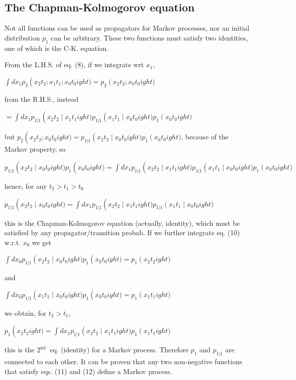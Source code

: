 \subsection*{The Chapman-Kolmogorov equation}
Not all functions can be used as propagators for Markov processes, nor an
initial distribution $p_{1}$ can be arbitrary. These two functions must satisfy
two identities, one of which is the C-K. equation.

From the L.H.S. of eq. (8), if we integrate wrt $x_1$,
\begin{DispWithArrows}[displaystyle, format=c]
  $\int d x_{1} p_{3}
  \left(x_{2} t_{2} ; x_{1} t_{1} ; x_{0} t_{0}ight)=p_{2}
  \left(x_{2} t_{2} ; x_{0} t_{0}ight)$
\end{DispWithArrows}
from the R.H.S., instead
\begin{DispWithArrows}[displaystyle, format=c]
  $=\int d x_{1} p_{1|1}
  \left(x_{2} t_{2}
  \mid x_{1} t_{1}ight) p_{1|1}
  \left(x_{1} t_{1}
  \mid x_{0} t_{0}ight) p_{1}
  \left(x_{0} t_{0}ight)$
\end{DispWithArrows}
but $p_{2}
\left(x_{2} t_{2} ; x_{0} t_{0}ight)=p_{1|1}
\left(x_{2} t_{2}
  \mid x_{0} t_{0}ight) p_{1}
  \left(x_{0} t_{0}ight)$, because of the Markov property, so
\begin{DispWithArrows}[displaystyle, format=c]
  $p_{1|1}
  \left(x_{2} t_{2}
  \mid x_{0} t_{0}ight) p_{1}
  \left(x_{0} t_{0}ight)=\int d x_{1} p_{1|1}
  \left(x_{2} t_{2}
  \mid x_{1} t_{1}ight) p_{1|1}
  \left(x_{1} t_{1}
  \mid x_{0} t_{0}ight) p_{1}
  \left(x_{0} t_{0}ight)$
\end{DispWithArrows}
hence, for any $t_{2}>t_{1}>t_{0}$
\begin{DispWithArrows}[displaystyle, format=c]
  $p_{1|1}
  \left(x_{2} t_{2}
  \mid x_{0} t_{0}ight)=\int d x_{1} p_{1|1}
  \left(x_{2} t_{2}
  \mid x_{1} t_{1}ight) p_{1|1}
  \left(x_{1} t_{1}
  \mid x_{0} t_{0}ight)$
\end{DispWithArrows}
this is the Chapman-Kolmogorov equation (actually, identity), which must be
satisfied by any propagator/transition probab. If we further integrate eq. (10)
 w.r.t. $x_{0}$ we get
\begin{DispWithArrows}[displaystyle, format=c]
  $\int d x_{0} p_{1|1}
  \left(x_{2} t_{2}
  \mid x_{0} t_{0}ight) p_{1}
  \left(x_{0} t_{0}ight)=p_{1}
  \left(x_{2} t_{2}ight)$
\end{DispWithArrows}
and
\begin{DispWithArrows}[displaystyle, format=c]
  $\int d x_{0} p_{1|1}
  \left(x_{1} t_{1}
  \mid x_{0} t_{0}ight) p_{1}
  \left(x_{0} t_{0}ight)=p_{1}
  \left(x_{1} t_{1}ight)$
\end{DispWithArrows}
we obtain, for $t_{2}>t_{1}$,
\begin{DispWithArrows}[displaystyle, format=c]
  $p_{1}
  \left(x_{2} t_{2}ight)=\int d x_{1} p_{1|1}
  \left(x_{2} t_{2}
  \mid x_{1} t_{1}ight) p_{1}
  \left(x_{1} t_{1}ight)$
\end{DispWithArrows}
this is the $2^{\text {nd }}$ eq. (identity) for a Markov process. Therefore
$p_{1}$ and $p_{1|1}$ are connected to each other.
It can be proven that any two non-negative functions that satisfy eqs. (11) and
(12) define a Markov process.

